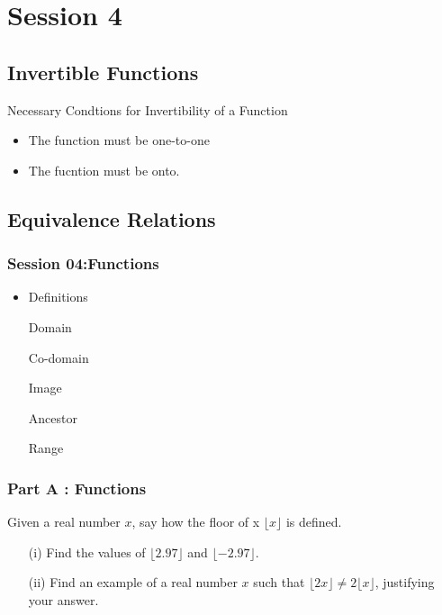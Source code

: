 \documentclass[]{report}
\begin{document}
\chapter{Session 4}
\section*{Invertible Functions}

Necessary Condtions for Invertibility of a Function
\begin{itemize}
\item The function must be one-to-one
\item The fucntion must be onto.
\end{itemize}


\section*{Equivalence Relations}


\subsection*{Session 04:Functions}
\begin{itemize}
\item Definitions
\end{itemize}

\begin{itemize}
\item[Domain]
\item[Co-domain]
\item[Image]
\item[Ancestor]
\item[Range]
\end{itemize}

\subsection*{Part A : Functions}
Given a real number $x$, say how the floor of x  $\lfloor x \rfloor$ is defined.
\begin{itemize}
\item[(i)] Find the values of $\lfloor 2.97 \rfloor$ and $\lfloor -2.97 \rfloor$.
\item[(ii)] Find an example of a real number $x$ such that $\lfloor 2x \rfloor  \neq 2\lfloor x \rfloor$, justifying your answer.
\end{itemize}
\end{document}
